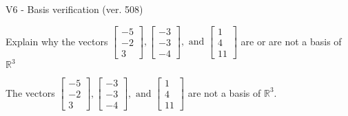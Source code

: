 \begin{exercise}
  \begin{exerciseTitle}V6 - Basis verification (ver. 508)\end{exerciseTitle}
  \begin{exerciseStatement}
    Explain why the vectors \(\left[\begin{array}{r}
-5 \\
-2 \\
3
\end{array}\right] , \left[\begin{array}{r}
-3 \\
-3 \\
-4
\end{array}\right] , \text{ and } \left[\begin{array}{r}
1 \\
4 \\
11
\end{array}\right]\) are or are not a basis of \(\mathbb{R}^3\)	


  \end{exerciseStatement}
  \begin{exerciseAnswer}
   The vectors \(\left[\begin{array}{r}
-5 \\
-2 \\
3
\end{array}\right] , \left[\begin{array}{r}
-3 \\
-3 \\
-4
\end{array}\right] , \text{ and } \left[\begin{array}{r}
1 \\
4 \\
11
\end{array}\right]\) 
  	 are not  a basis of \(\mathbb{R}^3\).
  


  \end{exerciseAnswer}
\end{exercise}